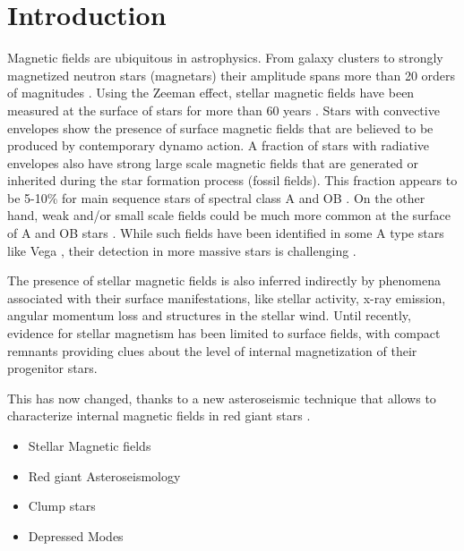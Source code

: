 \section{Introduction}
\label{intro}
Magnetic fields are ubiquitous in astrophysics. From  galaxy clusters to strongly magnetized neutron stars (magnetars) their amplitude spans more than 20 orders of magnitudes \citep{Brandenburg_2005}. Using the Zeeman effect, stellar magnetic fields have been measured at the surface of stars
for more than 60 years \citep{Babcock_1947,Landstreet_1992,Donati_2009}. Stars with convective envelopes show the presence of surface magnetic fields that are believed to be produced by contemporary dynamo action. A fraction of stars with radiative envelopes also have strong large scale magnetic fields that are generated or inherited during the star formation process (fossil fields). This fraction appears to be 5-10\% for main sequence stars of spectral class A \citep[e.g.,][]{Auri_re_2004} and OB \citep{2012ASPC..464..405W}. On the other hand, weak and/or small scale fields could be much more common at the surface of A and OB stars \citep{Cantiello_2011}. While such fields have been identified in some A type stars like Vega \cite{Ligni_res_2009}, their detection in more massive stars is challenging \cite{2013A&A...554A..93K}.

The presence of stellar magnetic fields is also inferred indirectly by phenomena associated with their surface manifestations, like stellar activity, x-ray emission, angular momentum loss and structures in the stellar wind. Until recently, evidence for stellar magnetism has been limited to surface fields, with compact remnants providing clues about the level of internal magnetization of their progenitor stars.

This has now changed, thanks to a new asteroseismic technique that allows to characterize internal magnetic fields in red giant stars \cite{Fuller_2015}. 
\begin{itemize}
\item Stellar Magnetic fields
\item Red giant Asteroseismology
\item Clump stars
\item Depressed Modes
\end{itemize}


  